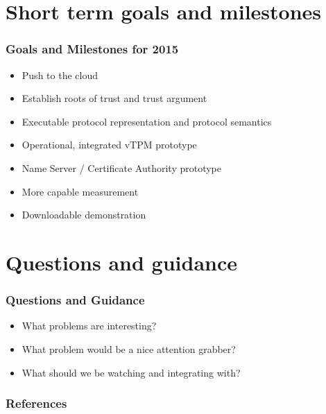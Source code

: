 \documentclass{beamer}
\begin{document}
\section{Short term goals and milestones}

\begin{frame}
  \frametitle{Goals and Milestones for 2015}

  \begin{itemize}
  \item Push to the cloud
  \item Establish roots of trust and trust argument
  \item Executable protocol representation and protocol semantics
  \item Operational, integrated vTPM prototype
  \item Name Server / Certificate Authority prototype
  \item More capable measurement
  \item Downloadable demonstration
  \end{itemize}
\end{frame}

\section{Questions and guidance}

\begin{frame}
  \frametitle{Questions and Guidance}

  \begin{itemize}
  \item What problems are interesting?
  \item What problem would be a nice attention grabber?
  \item What should we be watching and integrating with?
  \end{itemize}
\end{frame}

\nocite{Coker::Principles-of-R,Haldar:04:Semantic-Remote,Fabrega:1999aa}

\begin{frame}
  \frametitle{References}
  
\end{frame}
\end{document}
